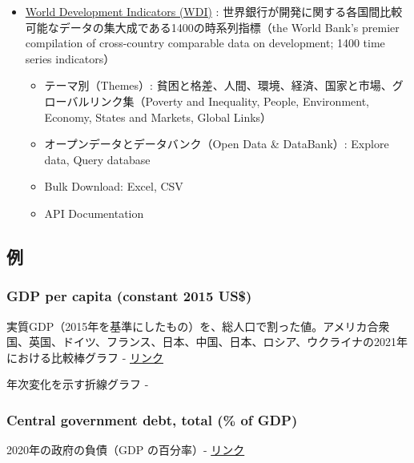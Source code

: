 \documentclass[
  xelatex, ja=standard]{bxjsbook}
\providecommand{\tightlist}{%
  \setlength{\itemsep}{0pt}\setlength{\parskip}{0pt}}
\theoremstyle{definition}
\theoremstyle{definition}
\theoremstyle{definition}
\theoremstyle{definition}
\theoremstyle{remark}
\begin{document}
\begin{itemize}
\tightlist
\item
  \href{https://datatopics.worldbank.org/world-development-indicators/}{World Development Indicators (WDI)} : 世界銀行が開発に関する各国間比較可能なデータの集大成である1400の時系列指標（the World Bank's premier compilation of cross-country comparable data on development; 1400 time series indicators）

  \begin{itemize}
  \tightlist
  \item
    テーマ別（Themes）: 貧困と格差、人間、環境、経済、国家と市場、グローバルリンク集（Poverty and Inequality, People, Environment, Economy, States and Markets, Global Links）
  \item
    オープンデータとデータバンク（Open Data \& DataBank）: Explore data, Query database
  \item
    Bulk Download: Excel, CSV
  \item
    API Documentation
  \end{itemize}
\end{itemize}

\hypertarget{ux4f8b}{%
\subsection{例}\label{ux4f8b}}

\hypertarget{gdp-per-capita-constant-2015-us}{%
\subsubsection{GDP per capita (constant 2015 US\$)}\label{gdp-per-capita-constant-2015-us}}

実質GDP（2015年を基準にしたもの）を、総人口で割った値。アメリカ合衆国、英国、ドイツ、フランス、日本、中国、日本、ロシア、ウクライナの2021年における比較棒グラフ - \href{https://data.worldbank.org/indicator/NY.GDP.PCAP.KD?locations=JP-GB-RU-FR-CN-US-UA-DE\&start=2021\&end=2021\&view=bar}{リンク}

年次変化を示す折線グラフ -

\hypertarget{central-government-debt-total-of-gdp}{%
\subsubsection{Central government debt, total (\% of GDP)}\label{central-government-debt-total-of-gdp}}

2020年の政府の負債（GDP の百分率）- \href{https://data.worldbank.org/indicator/GC.DOD.TOTL.GD.ZS?locations=JP-GB-RU-FR-CN-US-UA-DE\&start=2020\&end=2020\&view=bar}{リンク}
\end{document}
